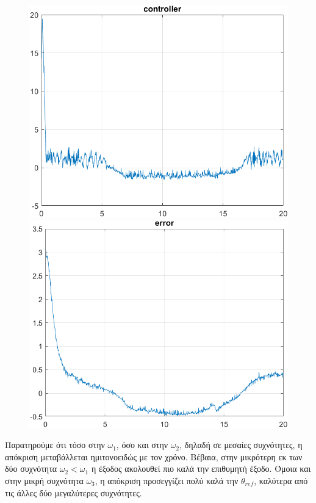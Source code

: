 \begin{enumerate}
\begin{figure}[H]
    \end{figure}
    \begin{figure}[H]
    \begin{minipage}{0.45\textwidth}
        \includegraphics[width=\linewidth]{Images/lab2/4/3/con2243.png}
    \end{minipage}
    \hfill
    \begin{minipage}{0.45\textwidth}
        \includegraphics[width=\linewidth]{Images/lab2/4/3/err2243.png}
    \end{minipage}
\end{figure}
\end{enumerate}
Παρατηρούμε ότι τόσο στην $ω_1$, όσο και στην $ω_2$, δηλαδή σε μεσαίες συχνότητες, η απόκριση μεταβάλλεται ημιτονοειδώς με τον χρόνο. Βέβαια, στην μικρότερη εκ των δύο συχνότητα $ω_2 < ω_1$ η έξοδος ακολουθεί πιο καλά την επιθυμητή έξοδο. Όμοια και στην μικρή συχνότητα $ω_3$, η απόκριση προσεγγίζει πολύ καλά την $θ_{ref}$, καλύτερα από τις άλλες δύο μεγαλύτερες συχνότητες.